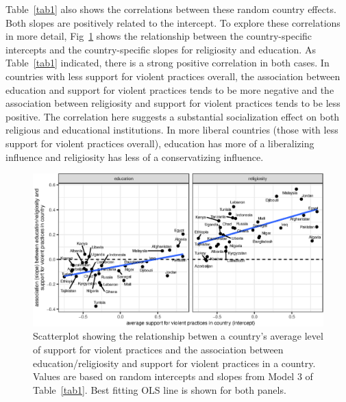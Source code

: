 \documentclass[10pt,letterpaper]{article}
\begin{document}
Table~\ref{tab1} also shows the correlations between these random country
effects. Both slopes are positively related to the intercept. To explore
these correlations in more detail, Fig~\ref{fig4} shows the relationship
between the country-specific intercepts and the country-specific slopes
for religiosity and education. As Table~\ref{tab1} indicated, there is a strong
positive correlation in both cases. In countries with less support for
violent practices overall, the association between education and support
for violent practices tends to be more negative and the association
between religiosity and support for violent practices tends to be less
positive. The correlation here suggests a substantial socialization
effect on both religious and educational institutions. In more liberal
countries (those with less support for violent practices overall),
education has more of a liberalizing influence and religiosity has less
of a conservatizing influence.

\begin{figure}[!h]
\begin{adjustwidth}{-2.25in}{0in}
\centering
\includegraphics{figures/fig4.eps}
\caption{Scatterplot showing the relationship betwen a country's average
level of support for violent practices and the association between
education/religiosity and support for violent practices in a country.
Values are based on random intercepts and slopes from Model 3 of Table~\ref{tab1}. Best fitting OLS line is shown for both panels.}
\label{fig4}
\end{adjustwidth}
\end{figure}
\end{document}
